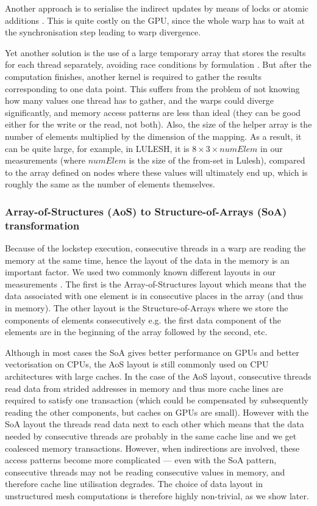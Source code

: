 Another approach is to serialise the indirect updates by means of locks or
atomic additions \cite{Kraus:2014:ACC:2691158.2691164}. This is quite costly on the GPU, since the whole warp has to
wait at the synchronisation step leading to warp divergence.

Yet another solution is the use of a large temporary array that stores the
results for each thread separately, avoiding race conditions by formulation \cite{LULESH:spec,miniaero}. But
after the computation finishes, another kernel is required to gather the results
corresponding to one data point. This suffers from the problem of not knowing
how many values one thread has to gather, and the warps could diverge
significantly, and memory access patterns are less than ideal (they can be good
either for the write or the read, not both). Also, the size of the helper array
is the number of elements multiplied by the dimension of the mapping. As a
result, it can be quite large, for example, in LULESH, it is \(8 \times 3 \times
numElem \) in our measurements (where $numElem$ is the size of the from-set in
Lulesh), compared to the array defined on nodes where these values will
ultimately end up, which is roughly the same as the number of elements
themselves.

\subsubsection{Array-of-Structures (AoS) to Structure-of-Arrays (SoA)
transformation} \label{aos-to-soa}

Because of the lockstep execution, consecutive threads in a warp are reading the
memory at the same time, hence the layout of the data in the memory is an
important factor. We used two commonly known different layouts in our measurements \cite{sharma2015data}. The first
is the Array-of-Structures layout which means that the data associated with one
element is in consecutive places in the array (and thus in memory). The other
layout is the Structure-of-Arrays where we store the components of elements
consecutively e.g.  the first data component of the elements are in the
beginning of the array followed by the second, etc.

Although in most cases the SoA gives better performance on GPUs and better
vectorisation on CPUs, the AoS layout is still commonly used on CPU
architectures with large caches. In the case of the AoS layout, consecutive
threads read data from strided addresses in memory and thus more cache lines are
required to satisfy one transaction (which could be compensated by subsequently
reading the other components, but caches on GPUs are small). However with the
SoA layout the threads read data next to each other which means that the data
needed by consecutive threads are probably in the same cache line and we get
coalesced memory transactions. However, when indirections are involved, these
access patterns become more complicated --- even with the SoA pattern,
consecutive threads may not be reading consecutive values in memory, and
therefore cache line utilisation degrades. The choice of data layout in
unstructured mesh computations is therefore highly non-trivial, as we show
later.

